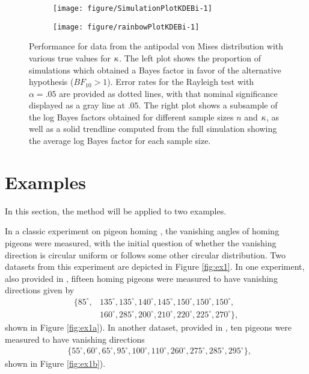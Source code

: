 \begin{figure}
  \begin{subfigure}[t]{0.5\linewidth}\centering
\begin{knitrout}
\color{fgcolor}
\texttt{[image: figure/SimulationPlotKDEBi-1]} 

\end{knitrout}
    \caption{}\label{fig:simKDEBierror}
  \end{subfigure}%
  \begin{subfigure}[t]{0.5\linewidth}\centering
\begin{knitrout}
\color{fgcolor}
\texttt{[image: figure/rainbowPlotKDEBi-1]} 

\end{knitrout}
    \caption{}\label{fig:simKDEBibfs}
  \end{subfigure}
  \caption{Performance for data from the antipodal von Mises distribution with various true values for \( \kappa \). The left plot shows the proportion of simulations which obtained a Bayes factor in favor of the alternative hypothesis (\(BF_{10} > 1\)). Error rates for the Rayleigh test with \(\alpha = .05\) are provided as dotted lines, with that nominal significance displayed as a gray line at \(.05\). The right plot shows a subsample of the log Bayes factors obtained for different sample sizes \(n\) and \(\kappa\), as well as a solid trendline computed from the full simulation showing the average log Bayes factor for each sample size.}\label{fig:simKDEBi}
\end{figure}



\section{Examples} \label{sec:ex}
In this section, the method will be applied to two examples. 




In a classic experiment on pigeon homing \citep{schmidt1963role}, the vanishing angles of homing pigeons were measured, with the initial question of whether the vanishing direction is circular uniform or follows some other circular distribution. Two datasets from this experiment are depicted in Figure \ref{fig:ex1}. In one experiment, also provided in \citet{fisher1995statistical}, fifteen homing pigeons were measured to have vanishing directions given by 
\begin{align*}
\{ 85^\circ, &135^\circ, 135^\circ, 140^\circ, 145^\circ, 150^\circ, 150^\circ, 150^\circ, \\ &160^\circ, 285^\circ, 200^\circ, 210^\circ, 220^\circ, 225^\circ, 270^\circ \},
\end{align*} 
shown in  Figure \ref{fig:ex1a}). In another dataset, provided in \citet{mardia2009directional}, ten pigeons were measured to have vanishing directions 
\begin{align*}
&\{ 55^\circ, 60^\circ, 65^\circ, 95^\circ, 100^\circ, 110^\circ, 260^\circ, 275^\circ, 285^\circ, 295^\circ\},
\end{align*} 
 shown in Figure \ref{fig:ex1b}).

